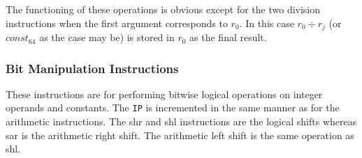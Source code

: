 \documentclass[english,a4paper]{article}
\begin{document}
The functioning of these operations is obvious except for the two
division instructions when the first argument corresponds to $r_0$. In
this case $r_0 \div r_j$ (or $const_{64}$ as the case may be) is
stored in $r_0$ as the final result.

\subsubsection{Bit Manipulation Instructions}

These instructions are for performing bitwise logical operations on
integer operands and constants. The \verb|IP| is incremented in the
same manner as for the arithmetic instructions. The shr and shl
instructions are the logical shifts whereas sar is the arithmetic
right shift. The arithmetic left shift is the same operation as shl.
\end{document}
